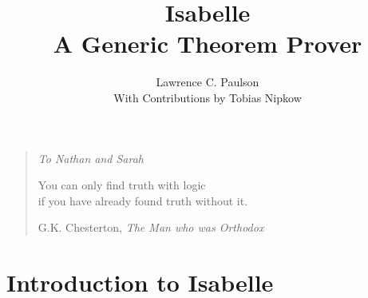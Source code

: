 %

\sloppy

\title{Isabelle\\A Generic Theorem Prover}
\author{Lawrence C. Paulson\\[2ex] With Contributions by Tobias Nipkow}

\date{} 
\makeindex

\def\S{Sect.\thinspace}%

\underscoreoff

\setcounter{secnumdepth}{2} \setcounter{tocdepth}{1}

\binperiod     %


\maketitle



\tableofcontents
\newpage
\listoffigures
\newpage

\markboth{}{}
\vspace*{2.5cm}
\begin{quote}\raggedleft
{\em To Nathan and Sarah}

\vspace*{1.2cm}
{\sanssi
You can only find truth with logic\\
if you have already found truth without it.}\\
\bigskip

G.K. Chesterton, {\em The Man who was Orthodox}
\end{quote}

\thispagestyle{empty}
\newpage
{}
\part{Introduction to Isabelle}   


